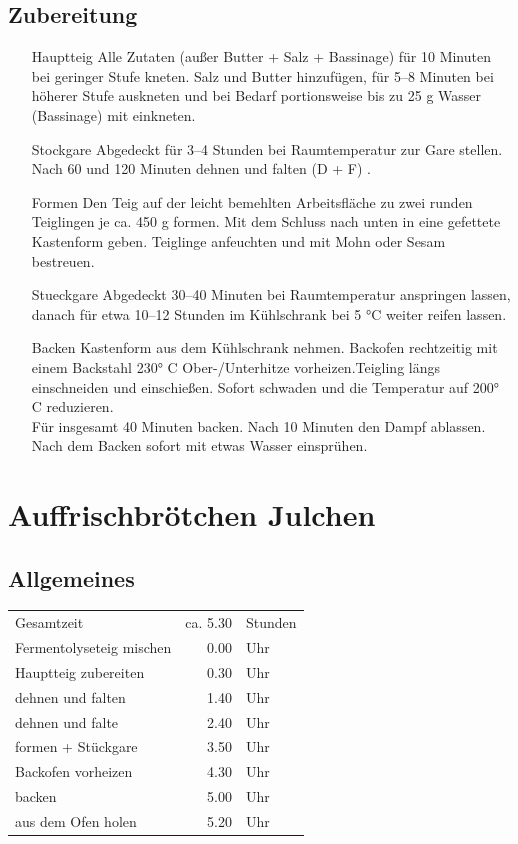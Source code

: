\subsection*{Zubereitung}
\begin{enumerate}
    \item  [\Gls{Hauptteig}]  Alle Zutaten (außer Butter + Salz + Bassinage) für 10 Minuten bei geringer Stufe kneten. Salz und Butter hinzufügen, für 5–8 Minuten bei höherer Stufe auskneten und bei Bedarf portionsweise bis zu 25 g     Wasser (Bassinage) mit einkneten.
    \item [\Gls{Stockgare}] Abgedeckt für 3–4 Stunden bei Raumtemperatur zur Gare stellen. Nach 60 und 120 Minuten dehnen und falten (D + F) . 
    \item [\Gls{Formen}] Den Teig auf der leicht bemehlten Arbeitsfläche zu zwei runden Teiglingen je ca. 450 g formen. Mit dem Schluss nach unten in eine gefettete Kastenform geben. Teiglinge anfeuchten und mit Mohn oder Sesam bestreuen.
    \item [\Gls{Stueckgare}] Abgedeckt 30–40 Minuten bei Raumtemperatur anspringen lassen, danach für etwa 10–12 Stunden im Kühlschrank bei 5 °C weiter reifen lassen.
    \item [\Gls{Backen}] Kastenform aus dem Kühlschrank nehmen. Backofen rechtzeitig mit einem Backstahl 230° C Ober-/Unterhitze vorheizen.Teigling längs einschneiden und einschießen. Sofort schwaden und die Temperatur auf 200° C reduzieren.\\ 
    Für insgesamt 40 Minuten backen. Nach 10 Minuten den Dampf ablassen. Nach dem Backen sofort mit etwas Wasser einsprühen.   
\end{enumerate}




\section{Auffrischbrötchen Julchen}  
\cite{sonjajulchen2022}
\subsection*{Allgemeines}
\begin{tabular}{lrl}
    Gesamtzeit               & ca. 5.30 & Stunden \\
    Fermentolyseteig mischen &     0.00 & Uhr     \\
    Hauptteig zubereiten     &     0.30 & Uhr     \\
    dehnen und falten        &     1.40 & Uhr     \\
    dehnen und falte         &     2.40 & Uhr     \\
    formen + Stückgare       &     3.50 & Uhr     \\
    Backofen vorheizen       &     4.30 & Uhr     \\
    backen                   &     5.00 & Uhr     \\
    aus dem Ofen holen       &     5.20 & Uhr
\end{tabular}

